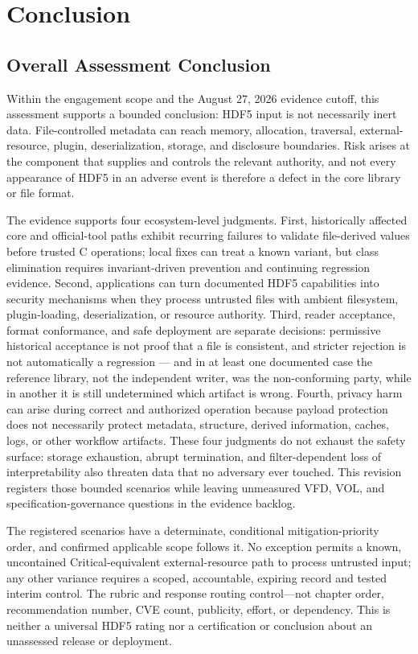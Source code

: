 \documentclass[../main.tex]{subfiles}
\begin{document}
\section{Conclusion}
\label{sec:conclusion}

\subsection{Overall Assessment Conclusion}

Within the engagement scope and the August 27, 2026 evidence cutoff, this
assessment supports a bounded conclusion: HDF5 input is not necessarily inert
data. File-controlled metadata can reach memory, allocation, traversal,
external-resource, plugin, deserialization, storage, and disclosure boundaries.
Risk arises at the component that supplies and controls the relevant authority,
and not every appearance of HDF5 in an adverse event is therefore a defect in
the core library or file format.

The evidence supports four ecosystem-level judgments. First, historically
affected core and official-tool paths exhibit recurring failures to validate
file-derived values before trusted C operations; local fixes can treat a known
variant, but class elimination requires invariant-driven prevention and
continuing regression evidence. Second, applications can turn documented HDF5
capabilities into security mechanisms when they process untrusted files with
ambient filesystem, plugin-loading, deserialization, or resource authority.
Third, reader acceptance, format conformance, and safe deployment are separate
decisions: permissive historical acceptance is not proof that a file is
consistent, and stricter rejection is not automatically a regression --- and in
at least one documented case the reference library, not the independent writer,
was the non-conforming party, while in another it is still undetermined which
artifact is wrong. Fourth,
privacy harm can arise during correct and authorized operation because payload
protection does not necessarily protect metadata, structure, derived
information, caches, logs, or other workflow artifacts. These four judgments do
not exhaust the safety surface: storage exhaustion, abrupt termination, and
filter-dependent loss of interpretability also threaten data that no adversary
ever touched. This revision registers those bounded scenarios while leaving
unmeasured VFD, VOL, and specification-governance questions in the evidence
backlog.

\begin{notebox}
The registered scenarios have a determinate, conditional mitigation-priority
order, and confirmed applicable scope follows it. No exception permits a known,
uncontained Critical-equivalent external-resource path to process untrusted
input; any other variance requires a scoped, accountable, expiring record and
tested interim control. The rubric and response routing control---not chapter
order, recommendation number, CVE count, publicity, effort, or dependency.
This is neither a universal HDF5 rating nor a certification or conclusion about
an unassessed release or deployment.
\end{notebox}
\end{document}
